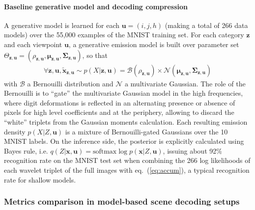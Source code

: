\documentclass[12pt,twoside,openright]{article}
\begin{document}
\paragraph{Baseline generative model and decoding compression}
A generative model is learned for each $\boldsymbol{u} = (i,j,h)$ (making a total of 266 data models) over the 55,000 examples of the MNIST training set. For each category $\boldsymbol{z}$ and each viewpoint $\boldsymbol{u}$, a generative {\color{Purple} emission} model is built over parameter set $\Theta_{\boldsymbol{z},\boldsymbol{u}} = (\rho_{\boldsymbol{z},\boldsymbol{u}}, \boldsymbol{\mu}_{\boldsymbol{z},\boldsymbol{u}}, \boldsymbol{\Sigma}_{\boldsymbol{z},\boldsymbol{u}})$, so that 
\begin{align}
\forall \boldsymbol{z},\boldsymbol{u}, \tilde{\boldsymbol{x}}_{\boldsymbol{z},\boldsymbol{u}} \sim
p(X|\boldsymbol{z},\boldsymbol{u}) =  \mathcal{B}(\rho_{\boldsymbol{z},\boldsymbol{u}}) \times \mathcal{N}(\boldsymbol{\mu}_{\boldsymbol{z},\boldsymbol{u}}, \boldsymbol{\Sigma}_{\boldsymbol{z},\boldsymbol{u}})\label{eq:bernouilli-gated}
\end{align} 
with $\mathcal{B}$ a Bernouilli distribution and $\mathcal{N}$ a multivariate Gaussian. The role of the Bernouilli is to ``gate'' the multivariate Gaussian model in the high frequencies, where digit deformations is reflected in an alternating presence or absence of pixels for high level coefficients and at the periphery, allowing to discard the ``white'' triplets from the Gaussian moments calculation. Each resulting emission density $p(X|Z,\boldsymbol{u})$ is a mixture of Bernouilli-gated Gaussians over the 10 MNIST labels. On the {\color{Purple}inference} side, the posterior is explicitly calculated using Bayes rule, i.e. $q(Z|\boldsymbol{x},\boldsymbol{u}) = \text{softmax} \log p(\boldsymbol{x}|Z,\boldsymbol{u})$, issuing about 92\% recognition rate on the MNIST test set when combining the 266 log likelihoods of each wavelet triplet of the full images with eq.~(\ref{eq:accum}), a typical recognition rate for shallow models.

\subsubsection{Metrics comparison in model-based scene decoding setups}
\end{document}
